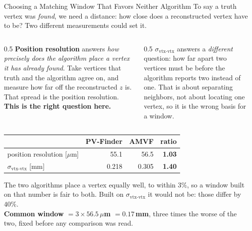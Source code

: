 \documentclass[xcolor=table,aspectratio=169]{beamer}
\begin{document}
\begin{frame}{Choosing a Matching Window That Favors Neither Algorithm}
    \small
    To say a truth vertex was \emph{found}, we need a distance: how close does a
    reconstructed vertex have to be? Two different measurements could set it.
    \vspace{0.5em}

    \begin{columns}[t]
        \begin{column}{0.5\linewidth}
            \textbf{\textcolor{mygreen!60!black}{Position resolution}} answers
            \emph{how precisely does the algorithm place a vertex it has already
            found}. Take vertices that truth and the algorithm agree on, and measure
            how far off the reconstructed $z$ is. That spread is the position
            resolution. \textbf{This is the right question here.}
        \end{column}
        \begin{column}{0.5\linewidth}
            \textbf{\textcolor{myred}{$\sigma_{\text{vtx-vtx}}$}} answers a
            \emph{different} question: how far apart two vertices must be before the
            algorithm reports two instead of one. That is about separating neighbors,
            not about locating one vertex, so it is the wrong basis for a window.
        \end{column}
    \end{columns}

    \vspace{0.7em}
    \centering
    \setlength{\tabcolsep}{9pt}
    \begin{tabular}{l rr r}
        \toprule
        & PV-Finder & AMVF & ratio \\
        \midrule
        \textcolor{mygreen!60!black}{position resolution} \textcolor{black!55}{[$\mu$m]}
            & 55.1 & 56.5 & \textcolor{mygreen!70!black}{\textbf{1.03}} \\
        \textcolor{myred}{$\sigma_{\text{vtx-vtx}}$} \textcolor{black!55}{[mm]}
            & 0.218 & 0.305 & \textcolor{myred}{\textbf{1.40}} \\
        \bottomrule
    \end{tabular}

    \vspace{0.7em}
    The two algorithms place a vertex equally well, to within $3\%$, so a window built
    on that number is fair to both. Built on $\sigma_{\text{vtx-vtx}}$ it would not be:
    those differ by $40\%$.\\[0.3em]
    \textcolor{pennred}{\textbf{Common window $= 3 \times 56.5\,\mu$m $= 0.17$\,mm}},
    three times the worse of the two, fixed before any comparison was read.
\end{frame}
\end{document}
